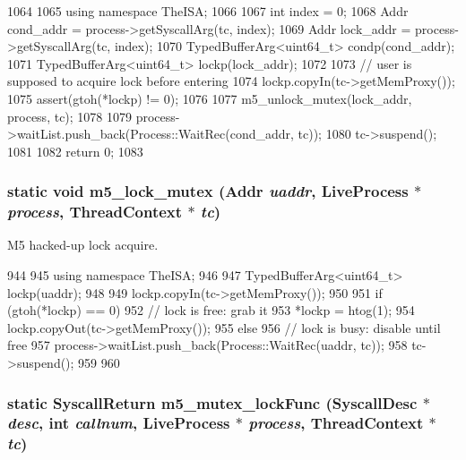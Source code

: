 \begin{DoxyCode}
1064     {
1065         using namespace TheISA;
1066 
1067         int index = 0;
1068         Addr cond_addr = process->getSyscallArg(tc, index);
1069         Addr lock_addr = process->getSyscallArg(tc, index);
1070         TypedBufferArg<uint64_t> condp(cond_addr);
1071         TypedBufferArg<uint64_t> lockp(lock_addr);
1072 
1073         // user is supposed to acquire lock before entering
1074         lockp.copyIn(tc->getMemProxy());
1075         assert(gtoh(*lockp) != 0);
1076 
1077         m5_unlock_mutex(lock_addr, process, tc);
1078 
1079         process->waitList.push_back(Process::WaitRec(cond_addr, tc));
1080         tc->suspend();
1081 
1082         return 0;
1083     }
\end{DoxyCode}
\hypertarget{classTru64_a029c70f7b96e2ccaa00ea5252875de90}{
\subsubsection[{m5\_\-lock\_\-mutex}]{\setlength{\rightskip}{0pt plus 5cm}static void m5\_\-lock\_\-mutex ({\bf Addr} {\em uaddr}, \/  {\bf LiveProcess} $\ast$ {\em process}, \/  {\bf ThreadContext} $\ast$ {\em tc})}}
\label{classTru64_a029c70f7b96e2ccaa00ea5252875de90}


M5 hacked-\/up lock acquire. 


\begin{DoxyCode}
944     {
945         using namespace TheISA;
946 
947         TypedBufferArg<uint64_t> lockp(uaddr);
948 
949         lockp.copyIn(tc->getMemProxy());
950 
951         if (gtoh(*lockp) == 0) {
952             // lock is free: grab it
953             *lockp = htog(1);
954             lockp.copyOut(tc->getMemProxy());
955         } else {
956             // lock is busy: disable until free
957             process->waitList.push_back(Process::WaitRec(uaddr, tc));
958             tc->suspend();
959         }
960     }
\end{DoxyCode}
\hypertarget{classTru64_a5a1fd874973f006aecd51e98ce0b6579}{
\subsubsection[{m5\_\-mutex\_\-lockFunc}]{\setlength{\rightskip}{0pt plus 5cm}static {\bf SyscallReturn} m5\_\-mutex\_\-lockFunc ({\bf SyscallDesc} $\ast$ {\em desc}, \/  int {\em callnum}, \/  {\bf LiveProcess} $\ast$ {\em process}, \/  {\bf ThreadContext} $\ast$ {\em tc})}}
\label{classTru64_a5a1fd874973f006aecd51e98ce0b6579}


